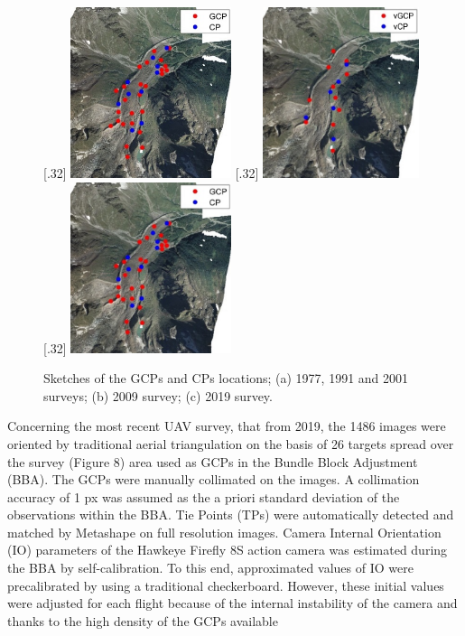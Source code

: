\begin{figure}
    \centering
    \subcaptionbox{\label{fig:2:gcp:historical}}[.32\textwidth]{
        \includegraphics[height=5cm]{gcp_historical}
    } 
    \subcaptionbox{\label{fig:2:gcp:2009}}[.32\textwidth]{
        \includegraphics[height=5cm]{gcp_2009}
    }
    \subcaptionbox{\label{fig:2:gcp:2019}}[.32\textwidth]{
        \includegraphics[height=5cm]{gcp_2019}
    } 
    \caption{Sketches of the GCPs and CPs locations; (a) 1977, 1991 and 2001 surveys; (b) 2009 survey; (c) 2019 survey.}
    \label{fig:2:gcp}
\end{figure}

Concerning the most recent UAV survey, that from 2019, the 1486 images were oriented by traditional aerial triangulation on the basis of 26 targets spread over the survey
(Figure 8) area used as GCPs in the Bundle Block Adjustment (BBA). The
GCPs were manually collimated on the images. A collimation accuracy of 1 px was assumed as the a priori standard deviation of the observations within the BBA. Tie Points
(TPs) were automatically detected and matched by Metashape on full resolution images.
Camera Internal Orientation (IO) parameters of the Hawkeye Firefly 8S action camera was
estimated during the BBA by self-calibration. To this end, approximated values of IO
were precalibrated by using a traditional checkerboard. However, these initial values were
adjusted for each flight because of the internal instability of the camera and thanks to the
high density of the GCPs available

